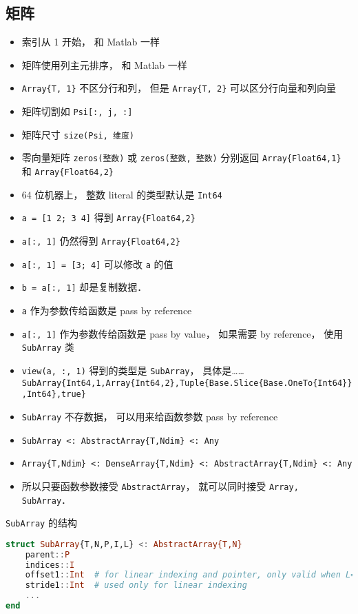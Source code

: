\subsection{矩阵}
\begin{itemize}
\item 索引从 1 开始， 和 Matlab 一样
\item 矩阵使用列主元排序， 和 Matlab 一样
\item \verb|Array{T, 1}| 不区分行和列， 但是 \verb|Array{T, 2}| 可以区分行向量和列向量
\item 矩阵切割如 \verb|Psi[:, j, :]|
\item 矩阵尺寸 \verb|size(Psi, 维度)|
\item 零向量矩阵 \verb|zeros(整数)| 或 \verb|zeros(整数, 整数)| 分别返回 \verb|Array{Float64,1}| 和 \verb|Array{Float64,2}|
\item 64 位机器上， 整数 literal 的类型默认是 \verb|Int64|
\item \verb|a = [1 2; 3 4]| 得到 \verb|Array{Float64,2}|
\item \verb|a[:, 1]| 仍然得到 \verb|Array{Float64,2}|
\item \verb|a[:, 1] = [3; 4]| 可以修改 \verb|a| 的值
\item \verb|b = a[:, 1]| 却是复制数据．
\item \verb|a| 作为参数传给函数是 pass by reference
\item \verb|a[:, 1]| 作为参数传给函数是 pass by value， 如果需要 by reference， 使用 \verb|SubArray| 类
\item \verb|view(a, :, 1)| 得到的类型是 \verb|SubArray|， 具体是…… \verb|SubArray{Int64,1,Array{Int64,2},Tuple{Base.Slice{Base.OneTo{Int64}},Int64},true}|
\item \verb|SubArray| 不存数据， 可以用来给函数参数 pass by reference
\item \verb|SubArray <: AbstractArray{T,Ndim} <: Any|
\item \verb|Array{T,Ndim} <: DenseArray{T,Ndim} <: AbstractArray{T,Ndim} <: Any|
\item 所以只要函数参数接受 \verb|AbstractArray|， 就可以同时接受 \verb|Array, SubArray|．
\end{itemize}

\verb|SubArray| 的结构
\begin{lstlisting}[language=julia]
struct SubArray{T,N,P,I,L} <: AbstractArray{T,N}
    parent::P
    indices::I
    offset1::Int  # for linear indexing and pointer, only valid when L==true
    stride1::Int  # used only for linear indexing
    ...
end
\end{lstlisting}


